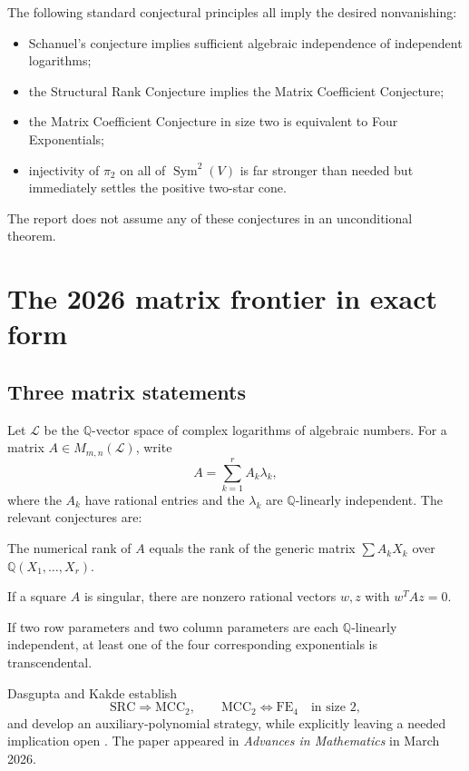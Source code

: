 \documentclass[11pt]{article}
\theoremstyle{definition}
\theoremstyle{remark}
\newcommand{\Q}{\mathbb{Q}}
\newcommand{\Sym}{\operatorname{Sym}}
\newcommand{\FE}{\mathrm{FE}_4}
\newcommand{\MCC}{\mathrm{MCC}_2}
\newcommand{\SRC}{\mathrm{SRC}}
\begin{document}
The following standard conjectural principles all imply the desired nonvanishing:
\begin{itemize}
\item Schanuel's conjecture implies sufficient algebraic independence of independent
logarithms;
\item the Structural Rank Conjecture implies the Matrix Coefficient Conjecture;
\item the Matrix Coefficient Conjecture in size two is equivalent to Four Exponentials;
\item injectivity of $\pi_2$ on all of $\Sym^2(V)$ is far stronger than needed but immediately
settles the positive two-star cone.
\end{itemize}
The report does not assume any of these conjectures in an unconditional theorem.

\section{The 2026 matrix frontier in exact form}
\label{sec:matrix-frontier}

\subsection{Three matrix statements}

Let $\mathscr L$ be the $\Q$-vector space of complex logarithms of algebraic numbers.
For a matrix $A\in M_{m,n}(\mathscr L)$, write
\[
 A=\sum_{k=1}^r A_k\lambda_k,
\]
where the $A_k$ have rational entries and the $\lambda_k$ are $\Q$-linearly independent.
The relevant conjectures are:

\begin{description}[leftmargin=3.4cm,style=nextline]
\item[Structural Rank.] The numerical rank of $A$ equals the rank of the generic matrix
$\sum A_kX_k$ over $\Q(X_1,\ldots,X_r)$.
\item[Matrix Coefficient.] If a square $A$ is singular, there are nonzero rational vectors
$w,z$ with $w^TAz=0$.
\item[Four Exponentials.] If two row parameters and two column parameters are each
$\Q$-linearly independent, at least one of the four corresponding exponentials is
transcendental.
\end{description}

Dasgupta and Kakde establish
\[
 \SRC\Longrightarrow\MCC,
 \qquad
 \MCC\Longleftrightarrow\FE
 \quad\text{in size }2,
\]
and develop an auxiliary-polynomial strategy, while explicitly leaving a needed implication
open \cite{DK2026}.  The paper appeared in \emph{Advances in Mathematics} in March 2026.
\end{document}
